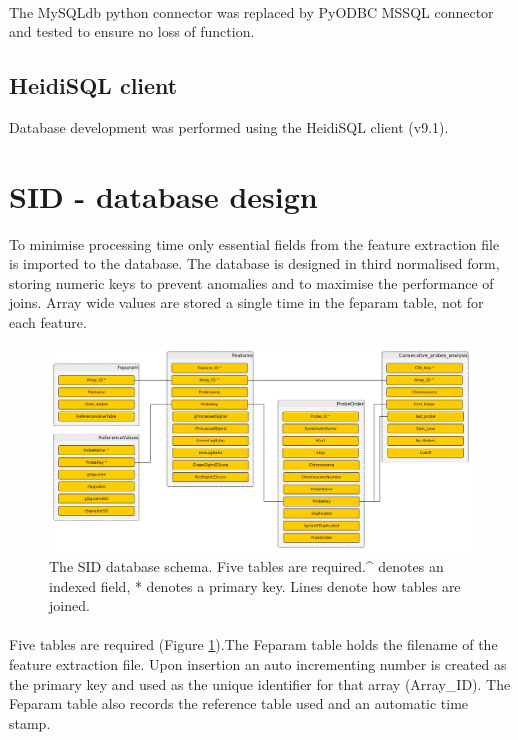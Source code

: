 \paragraph*{}
The MySQLdb python connector was replaced by PyODBC MSSQL connector \cite{pyodbc_mkleehammer/pyodbc_????} and tested to ensure no loss of function.

\subsection{HeidiSQL client}
Database development was performed using the HeidiSQL client (v9.1)\cite{heidisql_heidisql_2016}.

\section{SID - database design}
To minimise processing time only essential fields from the feature extraction file is imported to the database. The database is designed in third normalised form, storing numeric keys to prevent anomalies and to maximise the performance of joins. Array wide values are stored a single time in the feparam table, not for each feature.
\begin{figure}
\centering
\includegraphics[width=1.2\linewidth]{./Figures/SIDdbschema-simple}
\caption[The SID database schema]{The SID database schema. Five tables are required.\string^ denotes an indexed field, * denotes a primary key. Lines denote how tables are joined.}
\label{fig:SIDdbschema-simple}
\end{figure}

\paragraph*{}
Five tables are required (Figure \ref{fig:SIDdbschema-simple}).The Feparam table holds the filename of the feature extraction file. Upon insertion an auto incrementing number is created as the primary key and used as the unique identifier for that array (Array\_ID). The Feparam table also records the reference table used and an automatic time stamp. 
